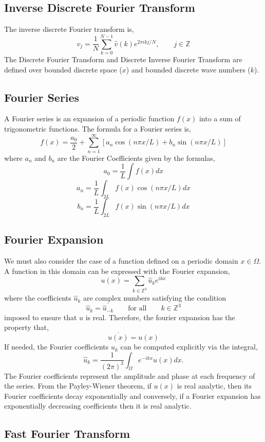 \documentclass[12pt]{article}
\begin{document}
\begin{flushleft}
\subsection{Inverse Discrete Fourier Transform}

The inverse discrete Fourier transform is,
$$v_j = \frac{1}{N}\sum_{k=0}^{N-1} \hat{v}(k)e^{2\pi ik j/N}, \qquad j\in\mathbb{Z}$$
The Discrete Fourier Transform and Discrete Inverse Fourier Transform are defined over bounded discrete space ($x$) and bounded discrete wave numbers ($k$).

\subsection{Fourier Series}

\qquad A Fourier series is an expansion of a periodic function $f(x)$ into a sum of trigonometric functions. The formula for a Fourier series is,
$$f(x) = \frac{a_0}{2}+
\sum_{n=1}^\infty \left[ a_n\cos(n\pi x/L)+b_n\sin(n\pi x/L) \right]$$
where $a_n$ and $b_n$ are the Fourier Coefficients given by the formulas,
$$a_0 = \frac{1}{L}\int f(x)dx$$
$$a_n = \frac{1}{L}\int_{2L}f(x)\cos(n\pi x/L)dx$$
$$b_n = \frac{1}{L}\int_{2L}f(x)\sin(n\pi x/L) dx$$

\subsection{Fourier Expansion}

\qquad We must also consider the case of a function defined on a periodic domain $x\in\Omega$. A function in this domain can be expressed with the Fourier expansion,
$$u(x) = \sum_{k\in \mathbb{Z}^3}\hat{u}_k e^{ikx}$$
where the coefficients $\hat{u}_k$ are complex numbers satisfying the condition
$$\hat{u}_k = \overline{\hat{u}_{-k}} \qquad \text{for all}  \qquad k \in \mathbb{Z}^3$$
imposed to ensure that $u$ is real. Therefore, the fourier expansion has the property that,
$$\overline{u(x)} = u(x)$$
If needed, the Fourier coefficients $\hat{u}_k$ can be computed explicitly via the integral,
$$\hat{u}_k = \frac{1}{(2\pi)^3}\int_{\Omega}e^{-ikx}u(x)dx.$$
\qquad The Fourier coefficients represent the amplitude and phase at each frequency of the series. From the Payley-Wiener theorem, if $u(x)$ is real analytic, then its Fourier coefficients decay exponentially and conversely, if a Fourier expansion has exponentially decreasing coefficients then it is real analytic.


\subsection{Fast Fourier Transform}


\end{flushleft}
\end{document}
